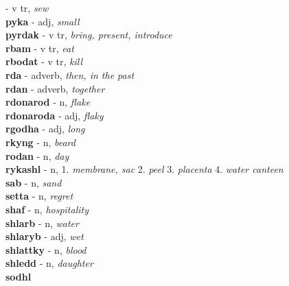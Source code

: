  - v tr, \emph{sew}\\ \vspace{7pt}\textbf{pyka}   - adj, \emph{small}\\ \vspace{7pt}\textbf{pyrdak}   - v tr, \emph{bring, present, introduce}\\ \vspace{7pt}\textbf{rbam}   - v tr, \emph{eat}\\ \vspace{7pt}\textbf{rbodat}   - v tr, \emph{kill}\\ \vspace{7pt}\textbf{rda}   - adverb, \emph{then, in the past}\\ \vspace{7pt}\textbf{rdan}   - adverb, \emph{together}\\ \vspace{7pt}\textbf{rdonarod}   - n, \emph{flake}\\ \vspace{7pt}\textbf{rdonaroda}   - adj, \emph{flaky}\\ \vspace{7pt}\textbf{rgodha}   - adj, \emph{long}\\ \vspace{7pt}\textbf{rkyng}   - n, \emph{beard}\\ \vspace{7pt}\textbf{rodan}   - n, \emph{day}\\ \vspace{7pt}\textbf{rykashl}   - n, 1. \emph{membrane, sac} 2. \emph{peel} 3. \emph{placenta} 4. \emph{water canteen} \\ \vspace{7pt}\textbf{sab}   - n, \emph{sand}\\ \vspace{7pt}\textbf{setta}   - n, \emph{regret}\\ \vspace{7pt}\textbf{shaf}   - n, \emph{hospitality}\\ \vspace{7pt}\textbf{shlarb}   - n, \emph{water}\\ \vspace{7pt}\textbf{shlaryb}   - adj, \emph{wet}\\ \vspace{7pt}\textbf{shlattky}   - n, \emph{blood}\\ \vspace{7pt}\textbf{shledd}   - n, \emph{daughter}\\ \vspace{7pt}\textbf{sodhl}  